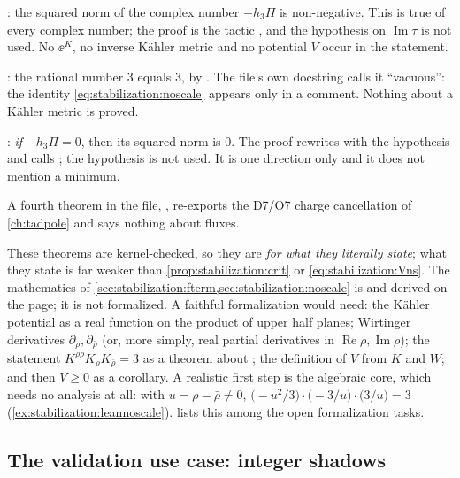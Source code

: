 \begin{leanbox}
: the squared norm of the complex number $-h_3\Pi$ is
non-negative. This is true of every complex number; the proof is the tactic
, and the hypothesis on $\operatorname{Im}\tau$ is not used. No $\ee^K$, no
inverse K\"ahler metric and no potential $V$ occur in the statement.

: the rational number $3$ equals $3$, by . The file's own
docstring calls it ``vacuous'': the identity \eqref{eq:stabilization:noscale} appears only in a
comment. Nothing about a K\"ahler metric is proved.

: \emph{if} $-h_3\Pi=0$, then its squared norm is $0$.
The proof rewrites with the hypothesis  and calls ; the hypothesis
 is not used. It is one direction only and it does not mention a minimum.

A fourth theorem in the file, , re-exports the
D7/O7 charge cancellation of \cref{ch:tadpole} and says nothing about fluxes.
\end{leanbox}
These theorems are kernel-checked, so they are \TA{} \emph{for what they literally state}; what
they state is far weaker than \cref{prop:stabilization:crit} or \eqref{eq:stabilization:Vns}.
The mathematics of \cref{sec:stabilization:fterm,sec:stabilization:noscale} is \TL{} and
derived on the page; it is not formalized. A faithful formalization would need: the K\"ahler
potential as a real function on the product of upper half planes; Wirtinger derivatives
$\partial_\rho,\partial_{\bar\rho}$ (or, more simply, real partial derivatives in
$\operatorname{Re}\rho,\operatorname{Im}\rho$); the statement
$K^{\rho\bar\rho}K_\rho K_{\bar\rho}=3$ as a theorem about ; the definition of
$V$ from $K$ and $W$; and then $V\ge0$ as a corollary. A realistic first step is the algebraic
core, which needs no analysis at all: with $u=\rho-\bar\rho\neq0$,
$\bigl(-u^2/3\bigr)\cdot\bigl(-3/u\bigr)\cdot\bigl(3/u\bigr)=3$
(\cref{ex:stabilization:leannoscale}).  lists this among the open
formalization tasks.

\subsection{The validation use case: integer shadows}

